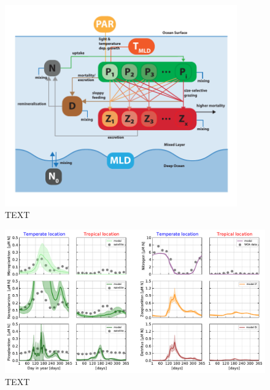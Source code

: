 \documentclass[journal abbreviation, manuscript]{copernicus}
\begin{document}
\begin{figure}[t]
\includegraphics[width=10cm]{Figures/firstdraft_schematics/03__schematics_SizeStructSlab.pdf}
\caption{TEXT}
\label{phydraschematics_3}
\end{figure}



\begin{figure}[t]
\includegraphics[width=12cm]{Figures/firstdraft_plots/04_sizestruct_slab.pdf}
\caption{TEXT}
\label{ASTroCAT_plot}
\end{figure}
\end{document}
